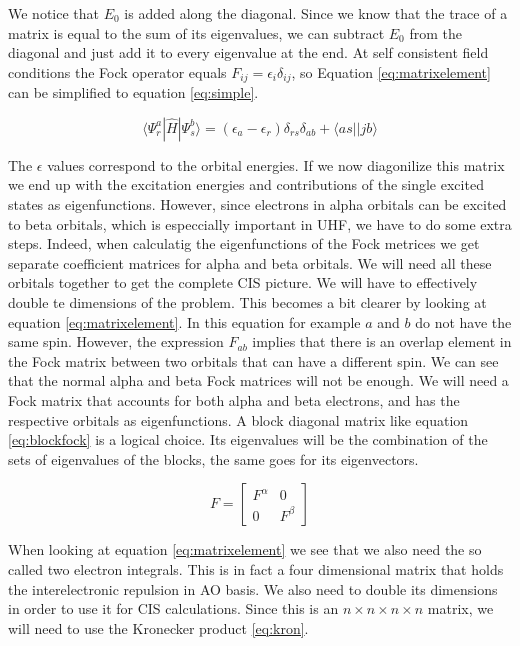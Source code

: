 \documentclass[twoside,twocolumn,9pt]{article}
\begin{document}
We notice that $E_0$ is added along the diagonal. Since we know that the trace of a matrix is equal to the sum of its eigenvalues, we can subtract $E_0$ from the diagonal and just
add it to every eigenvalue at the end. At self consistent field conditions the Fock operator equals $F_{ij} = \epsilon_i\delta_{ij}$, so Equation \eqref{eq:matrixelement} can be
simplified to equation \eqref{eq:simple}.

\begin{equation}\label{eq:simple}
  \langle \Psi_r^a|\hat{H}|\Psi_s^b \rangle = (\epsilon_a - \epsilon_r)\delta_{rs}\delta_{ab} + \langle as || jb \rangle
\end{equation}

The $\epsilon$ values correspond to the orbital energies. If we now diagonilize this matrix we end up with the excitation energies and contributions of the single excited states as
eigenfunctions. However, since electrons in alpha orbitals can be excited to beta orbitals, which is especcially important in UHF, we have to do some extra steps. Indeed, when
calculatig the eigenfunctions of the Fock metrices we get separate coefficient matrices for alpha and beta orbitals. We will need all these orbitals together to get the complete
CIS picture. We will have to effectively double te dimensions of the problem. This becomes a bit clearer by looking at equation \eqref{eq:matrixelement}. In this equation for example
$a$ and $b$ do not have the same spin. However, the expression $F_{ab}$ implies that there is an overlap element in the Fock matrix between two orbitals that can have a different spin.
We can see that the normal alpha and beta Fock matrices will not be enough. We will need a Fock matrix that accounts for both alpha and beta electrons, and has the respective orbitals
as eigenfunctions. A block diagonal matrix like equation \eqref{eq:blockfock} is a logical choice. Its eigenvalues will be the combination of the sets of eigenvalues of the blocks, 
the same goes for its eigenvectors.

\begin{equation}\label{eq:blockfock}
  F = \begin{bmatrix}
    F^\alpha & 0 \\
    0 & F^\beta
  \end{bmatrix}
\end{equation} 

When looking at equation \eqref{eq:matrixelement} we see that we also need the so called two electron integrals. This is in fact a four dimensional matrix that holds the 
interelectronic repulsion in AO basis. We also need to double its dimensions in order to use it for CIS calculations. Since this is an $n\times n\times n \times n$ 
matrix, we will need to use the Kronecker product \eqref{eq:kron}.
\end{document}
